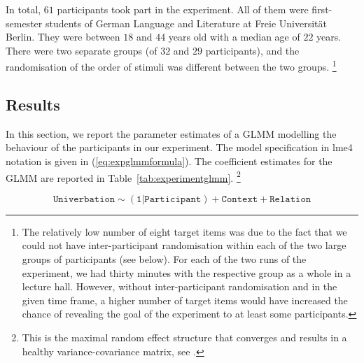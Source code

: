 \documentclass[biblatex, charis, linguex]{glossa}\usepackage{knitr}
\newcommand{\CM}[1]{\ensuremath{\mathsf{#1}}}
\begin{document}
In total, $61$ participants took part in the experiment.
All of them were first-semester students of German Language and Literature at Freie Universität Berlin.
They were between $18$ and $44$ years old with a median age of $22$ years.
There were two separate groups (of $32$ and $29$ participants), and the randomisation of the order of stimuli was different between the two groups.%
\footnote{The relatively low number of eight target items was due to the fact that we could not have inter-participant randomisation within each of the two large groups of participants (see below).
For each of the two runs of the experiment, we had thirty minutes with the respective group as a whole in a lecture hall.
However, without inter-participant randomisation and in the given time frame, a higher number of target items would have increased the chance of revealing the goal of the experiment to at least some participants.\label{fno:eightitems}}

\subsection{Results}
\label{sub:resultsexperiment}

In this section, we report the parameter estimates of a GLMM modelling the behaviour of the participants in our experiment.
The model specification in lme4 notation is given in (\ref{eq:expglmmformula}).
The coefficient estimates for the GLMM are reported in Table~\ref{tab:experimentglmm}.%
\footnote{This is the maximal random effect structure that converges and results in a healthy variance-covariance matrix, see \mbox{\citet{Schaefer2020a}}.}

\begin{equation}
  \mathtt{Univerbation\sim (1|Participant)+Context+Relation}
  \label{eq:expglmmformula}
\end{equation}




\begin{table}[h!]
\centering
{}
\caption{Coefficient table for the GLMM  modelling the experiment data with 95\% profile likelihood ratio confidence intervals. The intercept models the levels Context~=~Infinitive and Relation~=~Argument. Random effect for participant: \CM{sd=1.648}. Nakagawa \& Schielzeth's \CM{R^2_m=0.836} and \CM{R^2_c=0.910}} 
\label{tab:experimentglmm}
\end{table}
\end{document}
